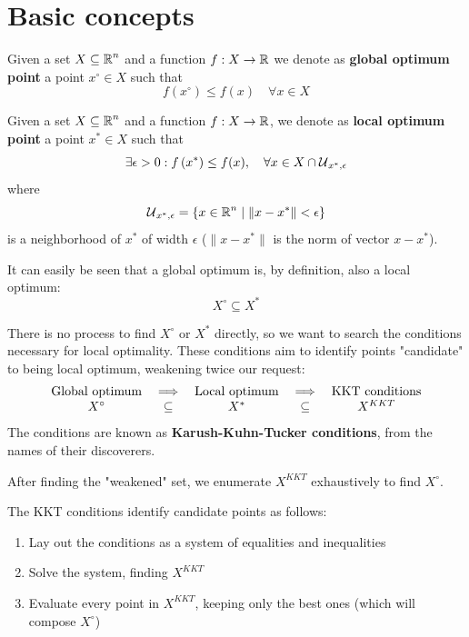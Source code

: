 \section{Basic concepts}
\label{sec:mathbasic}

\begin{definition}
	Given a set $X \subseteq \operatorname{\mathbb{R}}^n$ and a function $f: X \rightarrow \operatorname{\mathbb{R}}$ we denote as \textbf{global optimum point} a point $x^\circ \in X$ such that
	$$ f\left(x^\circ \right) \leq f(x) \quad \forall x \in X $$
\end{definition}

\begin{definition}
	Given a set $X \subseteq \operatorname{\mathbb{R}}^n$ and a function $f: X \rightarrow \operatorname{\mathbb{R}}$, we denote as \textbf{local optimum point} a point $x^\ast \in X$ such that 
	$$ \exists \epsilon > 0 : f\left(x^\ast\right) \leq f(x), \quad \forall x \in X \cap \operatorname{\mathcal{U}}_{x^\ast, \epsilon} $$
	where
	$$ \operatorname{\mathcal{U}}_{x^\ast, \epsilon} = \left\{x \in \operatorname{\mathbb{R}}^n \mid \| x - x^\ast \| < \epsilon \right\} $$
	is a neighborhood of $x^\ast$ of width $\epsilon$ ($\|x - x^\ast \|$ is the norm of vector $x - x^\ast$).
\end{definition}

It can easily be seen that a global optimum is, by definition, also a local optimum:
$$ X^\circ \subseteq X^\ast $$

There is no process to find $X^\circ$ or $X^\ast$ directly, so we want to search the conditions necessary for local optimality. These conditions aim to identify points "candidate" to being local optimum, weakening twice our request:
$$ 
\begin{array}{c c c c c}
	\text{Global optimum} & \implies & \text{Local optimum} & \implies & \text{KKT conditions} \\
	X^\circ & \subseteq & X^\ast & \subseteq & X^{KKT} 
\end{array}
$$
The conditions are known as \textbf{Karush-Kuhn-Tucker conditions}, from the names of their discoverers.

After finding the "weakened" set, we enumerate $X^{KKT}$ exhaustively to find $X^\circ$. 

The KKT conditions identify candidate points as follows: 
\begin{enumerate}
	\item Lay out the conditions as a system of equalities and inequalities
	
	\item Solve the system, finding $X^{KKT}$
	
	\item Evaluate every point in $X^{KKT}$, keeping only the best ones (which will compose $X^\circ$)
\end{enumerate}

